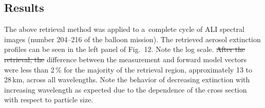 \documentclass[amtd, online, hvmath]{copernicus}
\providecommand{\DIFadd}[1]{{\protect\color{blue}\uwave{#1}}} %
\providecommand{\DIFdel}[1]{{\protect\color{red}\sout{#1}}}                      %
\providecommand{\DIFaddbegin}{} %
\providecommand{\DIFaddend}{} %
\providecommand{\DIFdelbegin}{} %
\providecommand{\DIFdelend}{} %
\begin{document}
\subsection{Results}

The above retrieval method was applied to a~complete cycle of ALI
spectral images (number 204--216 of the balloon mission). The
retrieved aerosol extinction profiles can be seen in the left panel of
Fig.~12. Note the log scale. \DIFdelbegin \DIFdel{After the retrieval, the }\DIFdelend \DIFaddbegin \DIFadd{The }\DIFaddend difference
between the measurement and forward model vectors were less than
2\,{\%} for the majority of the retrieval region, approximately 13 to
28\,\unit{km}, across all wavelengths. Note the behavior of decreasing
extinction with increasing wavelength as expected due to the
dependence of the cross section with respect to particle size.
\end{document}
